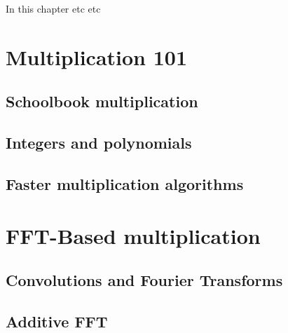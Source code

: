 In this chapter etc etc
\section{Multiplication 101}
\subsection{Schoolbook multiplication}

\subsection{Integers and polynomials}

\subsection{Faster multiplication algorithms}


\section{FFT-Based multiplication}
\subsection{Convolutions and Fourier Transforms}

\subsection{Additive FFT}

